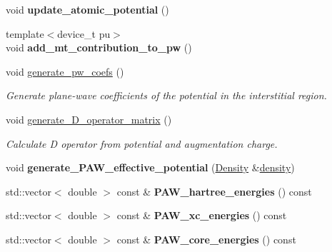 \begin{DoxyCompactItemize}
\item 
\hypertarget{classsirius_1_1_potential_a57df8029903153c8c6e4f8c71347334e}{}void {\bfseries update\+\_\+atomic\+\_\+potential} ()\label{classsirius_1_1_potential_a57df8029903153c8c6e4f8c71347334e}

\item 
\hypertarget{classsirius_1_1_potential_aa15c3084148757dd135180fe287e4497}{}{\footnotesize template$<$device\+\_\+t pu$>$ }\\void {\bfseries add\+\_\+mt\+\_\+contribution\+\_\+to\+\_\+pw} ()\label{classsirius_1_1_potential_aa15c3084148757dd135180fe287e4497}

\item 
void \hyperlink{classsirius_1_1_potential_aef421db1d4ce4ece0be0cea7e0f0b12c}{generate\+\_\+pw\+\_\+coefs} ()
\begin{DoxyCompactList}\small\item\em Generate plane-\/wave coefficients of the potential in the interstitial region. \end{DoxyCompactList}\item 
void \hyperlink{classsirius_1_1_potential_ac53f9c549fb2e2a5e02992a823e792e7}{generate\+\_\+\+D\+\_\+operator\+\_\+matrix} ()
\begin{DoxyCompactList}\small\item\em Calculate D operator from potential and augmentation charge. \end{DoxyCompactList}\item 
\hypertarget{classsirius_1_1_potential_a7bdec7be7e6c4e71866dda172c4545b5}{}void {\bfseries generate\+\_\+\+P\+A\+W\+\_\+effective\+\_\+potential} (\hyperlink{classsirius_1_1_density}{Density} \&\hyperlink{sirius__api_8cpp_a27c9852fd9c283b3432aaea8d778ab45}{density})\label{classsirius_1_1_potential_a7bdec7be7e6c4e71866dda172c4545b5}

\item 
\hypertarget{classsirius_1_1_potential_a6c5bd2a5f8c04ba5543520be68a4bcec}{}std\+::vector$<$ double $>$ const \& {\bfseries P\+A\+W\+\_\+hartree\+\_\+energies} () const \label{classsirius_1_1_potential_a6c5bd2a5f8c04ba5543520be68a4bcec}

\item 
\hypertarget{classsirius_1_1_potential_a6b24e1e07b6eb8a037142fb4baf2e3d0}{}std\+::vector$<$ double $>$ const \& {\bfseries P\+A\+W\+\_\+xc\+\_\+energies} () const \label{classsirius_1_1_potential_a6b24e1e07b6eb8a037142fb4baf2e3d0}

\item 
\hypertarget{classsirius_1_1_potential_a2b9815edd04a4b62b2e945e629d5bda1}{}std\+::vector$<$ double $>$ const \& {\bfseries P\+A\+W\+\_\+core\+\_\+energies} () const \label{classsirius_1_1_potential_a2b9815edd04a4b62b2e945e629d5bda1}


\end{DoxyCompactItemize}
